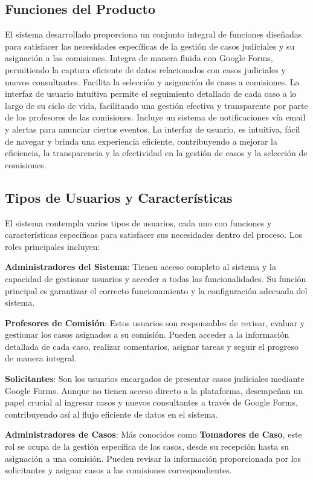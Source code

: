 \subsection{Funciones del Producto}
El sistema desarrollado proporciona un conjunto integral de funciones diseñadas para satisfacer las necesidades específicas de la gestión de casos judiciales y su asignación a las comisiones. Integra de manera fluida con Google Forms, permitiendo la captura eficiente de datos relacionados con casos judiciales y nuevos consultantes. Facilita la selección y asignación de casos a comisiones. La interfaz de usuario intuitiva permite el seguimiento detallado de cada caso a lo largo de su ciclo de vida, facilitando una gestión efectiva y transparente por parte de los profesores de las comisiones. Incluye un sistema de notificaciones vía email y alertas para anunciar ciertos eventos. La interfaz de usuario, es intuitiva, fácil de navegar y brinda una experiencia eficiente, contribuyendo a mejorar la eficiencia, la transparencia y la efectividad en la gestión de casos y la selección de comisiones.

\subsection{Tipos de Usuarios y Características}
El sistema contempla varios tipos de usuarios, cada uno con funciones y características específicas para satisfacer sus necesidades dentro del proceso. Los roles principales incluyen:

\textbf{Administradores del Sistema}: Tienen acceso completo al sistema y la capacidad de gestionar usuarios y acceder a todas las funcionalidades. Su función principal es garantizar el correcto funcionamiento y la configuración adecuada del sistema.

\textbf{Profesores de Comisión}: Estos usuarios son responsables de revisar, evaluar y gestionar los casos asignados a su comisión. Pueden acceder a la información detallada de cada caso, realizar comentarios, asignar tareas y seguir el progreso de manera integral.

\textbf{Solicitantes}: Son los usuarios encargados de presentar casos judiciales mediante Google Forms. Aunque no tienen acceso directo a la plataforma, desempeñan un papel crucial al ingresar casos y nuevos consultantes a través de Google Forms, contribuyendo así al flujo eficiente de datos en el sistema.

\textbf{Administradores de Casos}: Más conocidos como \textbf{Tomadores de Caso}, este rol se ocupa de la gestión específica de los casos, desde su recepción hasta su asignación a una comisión. Pueden revisar la información proporcionada por los solicitantes y asignar casos a las comisiones correspondientes.




